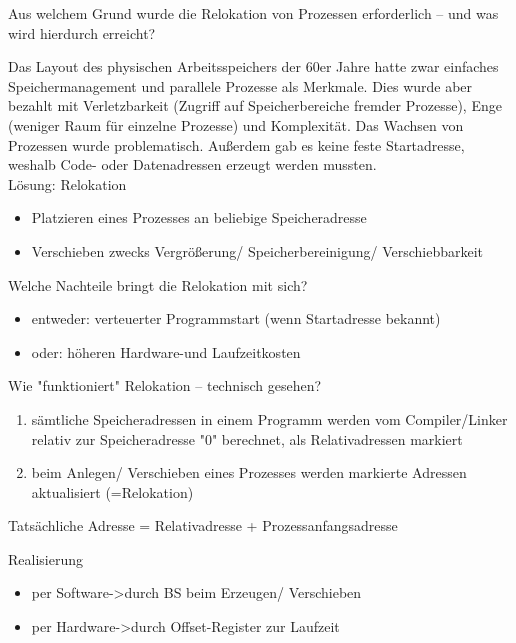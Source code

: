 \documentclass[avery5371]{flashcards}
\begin{document}
\begin{flashcard}[Speichermanagement]{Aus welchem Grund wurde die Relokation von Prozessen erforderlich – und was wird hierdurch erreicht?}
    \scriptsize{
    Das Layout des physischen Arbeitsspeichers der 60er Jahre hatte zwar einfaches Speichermanagement und parallele Prozesse als Merkmale.
    Dies wurde aber bezahlt mit Verletzbarkeit (Zugriff auf Speicherbereiche fremder Prozesse), Enge (weniger Raum für einzelne Prozesse) und Komplexität. Das Wachsen von Prozessen wurde problematisch. Außerdem gab es keine feste Startadresse, weshalb Code- oder Datenadressen erzeugt werden mussten.\\

    Lösung: Relokation
    \begin{itemize}
        \item Platzieren eines Prozesses an beliebige Speicheradresse
        \item Verschieben zwecks Vergrößerung/ Speicherbereinigung/ Verschiebbarkeit
    \end{itemize}
    }
\end{flashcard}

\begin{flashcard}[Speichermanagement]{Welche Nachteile bringt die Relokation mit sich?}
    \begin{itemize}
        \item entweder: verteuerter Programmstart (wenn Startadresse bekannt)
        \item oder: höheren Hardware-und Laufzeitkosten
    \end{itemize}
\end{flashcard}

\begin{flashcard}[Speichermanagement]{Wie "funktioniert" Relokation – technisch gesehen? }
    \scriptsize{
    \begin{enumerate}
        \item sämtliche Speicheradressen in einem Programm werden vom Compiler/Linker relativ zur Speicheradresse "0" berechnet, als Relativadressen markiert
        \item beim Anlegen/ Verschieben eines Prozesses werden markierte Adressen aktualisiert (=Relokation)
    \end{enumerate}
        Tatsächliche Adresse = Relativadresse + Prozessanfangsadresse

        Realisierung
    \begin{itemize}
        \item per Software->durch BS beim Erzeugen/ Verschieben
        \item per Hardware->durch Offset-Register zur Laufzeit
    \end{itemize}
    }
\end{flashcard}
\end{document}
